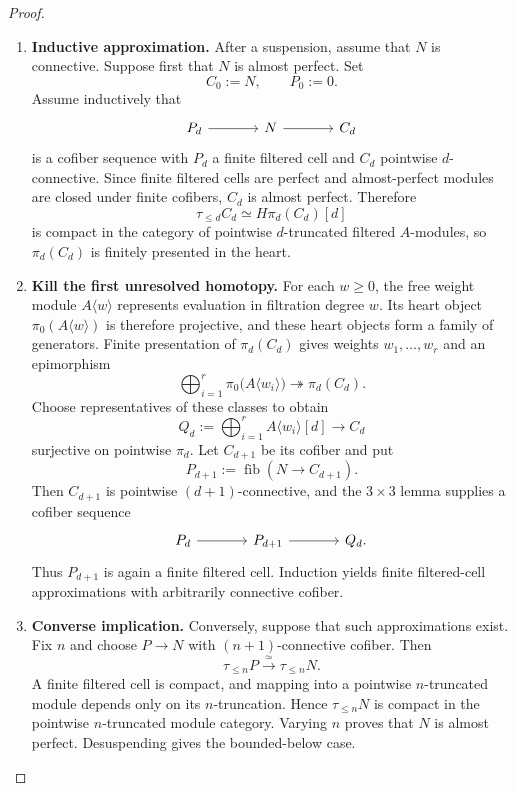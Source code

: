 \begin{proof}
\leavevmode
\begin{enumerate}[label=\textup{(\arabic*)}]
    \item \textbf{Inductive approximation.}
    After a suspension, assume that \(N\) is connective. Suppose first that
    \(N\) is almost perfect. Set
    \[
        C_0:=N,
        \qquad
        P_0:=0.
    \]
    Assume inductively that
    \[
    \begin{tikzcd}[column sep=large]
        P_d \arrow[r] & N \arrow[r] & C_d
    \end{tikzcd}
    \]
    is a cofiber sequence with \(P_d\) a finite filtered cell and \(C_d\)
    pointwise \(d\)-connective. Since finite filtered cells are perfect and
    almost-perfect modules are closed under finite cofibers, \(C_d\) is almost
    perfect. Therefore
    \[
        \tau_{\leq d}C_d
        \simeq
        H\pi_d(C_d)[d]
    \]
    is compact in the category of pointwise \(d\)-truncated filtered
    \(A\)-modules, so \(\pi_d(C_d)\) is finitely presented in the heart.
    \item \textbf{Kill the first unresolved homotopy.}
    For each \(w\geq0\), the free weight module \(A\langle w\rangle\) represents
    evaluation in filtration degree \(w\). Its heart object
    \(\pi_0(A\langle w\rangle)\) is therefore projective, and these heart objects
    form a family of generators. Finite presentation of \(\pi_d(C_d)\) gives
    weights \(w_1,\ldots,w_r\) and an epimorphism
    \[
        \bigoplus_{i=1}^r
        \pi_0\bigl(A\langle w_i\rangle\bigr)
        \twoheadrightarrow
        \pi_d(C_d).
    \]
    Choose representatives of these classes to obtain
    \[
        Q_d:=
        \bigoplus_{i=1}^rA\langle w_i\rangle[d]
        \longrightarrow
        C_d
    \]
    surjective on pointwise \(\pi_d\). Let \(C_{d+1}\) be its cofiber and put
    \[
        P_{d+1}:=\operatorname{fib}(N\to C_{d+1}).
    \]
    Then \(C_{d+1}\) is pointwise \((d+1)\)-connective, and the \(3\times3\)
    lemma supplies a cofiber sequence
    \[
    \begin{tikzcd}[column sep=large]
        P_d \arrow[r] & P_{d+1} \arrow[r] & Q_d .
    \end{tikzcd}
    \]
    Thus \(P_{d+1}\) is again a finite filtered cell. Induction yields finite
    filtered-cell approximations with arbitrarily connective cofiber.
    \item \textbf{Converse implication.}
    Conversely, suppose that such approximations exist. Fix \(n\) and choose
    \(P\to N\) with \((n+1)\)-connective cofiber. Then
    \[
        \tau_{\leq n}P\xrightarrow{\simeq}\tau_{\leq n}N.
    \]
    A finite filtered cell is compact, and mapping into a pointwise
    \(n\)-truncated module depends only on its \(n\)-truncation. Hence
    \(\tau_{\leq n}N\) is compact in the pointwise \(n\)-truncated module
    category. Varying \(n\) proves that \(N\) is almost perfect. Desuspending
    gives the bounded-below case.
\end{enumerate}
\end{proof}


